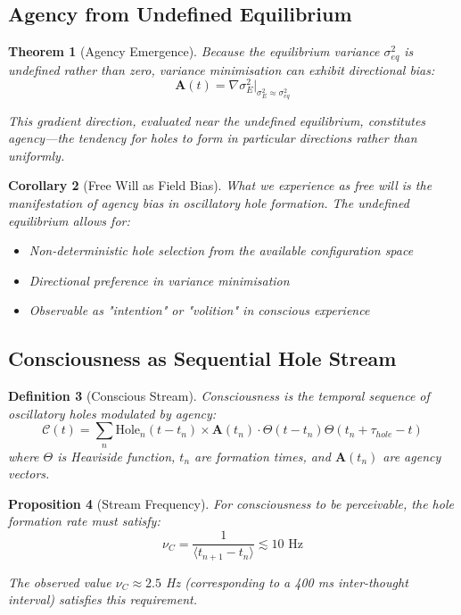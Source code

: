 \documentclass[12pt,a4paper]{article}
\newtheorem{theorem}{Theorem}[section]
\newtheorem{definition}[theorem]{Definition}
\newtheorem{corollary}[theorem]{Corollary}
\newtheorem{proposition}[theorem]{Proposition}
\begin{document}
\subsection{Agency from Undefined Equilibrium}

\begin{theorem}[Agency Emergence]
Because the equilibrium variance $\sigma^2_{eq}$ is undefined rather than zero, variance minimisation can exhibit directional bias:
\begin{equation}
\mathbf{A}(t) = \nabla \sigma^2_E \big|_{\sigma^2_E \approx \sigma^2_{eq}}
\end{equation}

This gradient direction, evaluated near the undefined equilibrium, constitutes agency—the tendency for holes to form in particular directions rather than uniformly.
\end{theorem}

\begin{corollary}[Free Will as Field Bias]
What we experience as free will is the manifestation of agency bias in oscillatory hole formation. The undefined equilibrium allows for:
\begin{itemize}
\item Non-deterministic hole selection from the available configuration space
\item Directional preference in variance minimisation
\item Observable as "intention" or "volition" in conscious experience
\end{itemize}
\end{corollary}

\subsection{Consciousness as Sequential Hole Stream}

\begin{definition}[Conscious Stream]
Consciousness is the temporal sequence of oscillatory holes modulated by agency:
\begin{equation}
\mathcal{C}(t) = \sum_{n} \text{Hole}_n(t - t_n) \times \mathbf{A}(t_n) \cdot \Theta(t - t_n) \Theta(t_n + \tau_{hole} - t)
\end{equation}
where $\Theta$ is Heaviside function, $t_n$ are formation times, and $\mathbf{A}(t_n)$ are agency vectors.
\end{definition}

\begin{proposition}[Stream Frequency]
For consciousness to be perceivable, the hole formation rate must satisfy:
\begin{equation}
\nu_C = \frac{1}{\langle t_{n+1} - t_n \rangle} \lesssim 10 \text{ Hz}
\end{equation}

The observed value $\nu_C \approx 2.5$ Hz (corresponding to a 400 ms inter-thought interval) satisfies this requirement.
\end{proposition}
\end{document}
